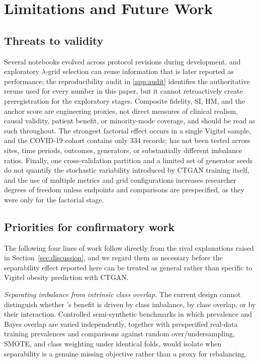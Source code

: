 \section{Limitations and Future Work}
\label{sec:limitations}

\subsection{Threats to validity}
\label{sec:threats}

Several notebooks evolved across protocol revisions during development, and exploratory $\lambda$-grid selection can reuse information that is later reported as performance; the reproducibility audit in \ref{app:audit} identifies the authoritative reruns used for every number in this paper, but it cannot retroactively create preregistration for the exploratory stages. Composite fidelity, SI, HM, and the anchor score are engineering proxies, not direct measures of clinical realism, causal validity, patient benefit, or minority-mode coverage, and should be read as such throughout. The strongest factorial effect occurs in a single Vigitel sample, and the COVID-19 cohort contains only 334 records; \sepa{} has not been tested across sites, time periods, outcomes, generators, or substantially different imbalance ratios. Finally, one cross-validation partition and a limited set of generator seeds do not quantify the stochastic variability introduced by CTGAN training itself, and the use of multiple metrics and grid configurations increases researcher degrees of freedom unless endpoints and comparisons are prespecified, as they were only for the factorial stage.

\subsection{Priorities for confirmatory work}
\label{sec:future-studies}

The following four lines of work follow directly from the rival explanations raised in Section~\ref{sec:discussion}, and we regard them as necessary before the separability effect reported here can be treated as general rather than specific to Vigitel obesity prediction with CTGAN.

\emph{Separating imbalance from intrinsic class overlap.} The current design cannot distinguish whether \sepa{}'s benefit is driven by class imbalance, by class overlap, or by their interaction. Controlled semi-synthetic benchmarks in which prevalence and Bayes overlap are varied independently, together with prespecified real-data training prevalences and comparisons against random over/undersampling, SMOTE, and class weighting under identical folds, would isolate when separability is a genuine missing objective rather than a proxy for rebalancing.

